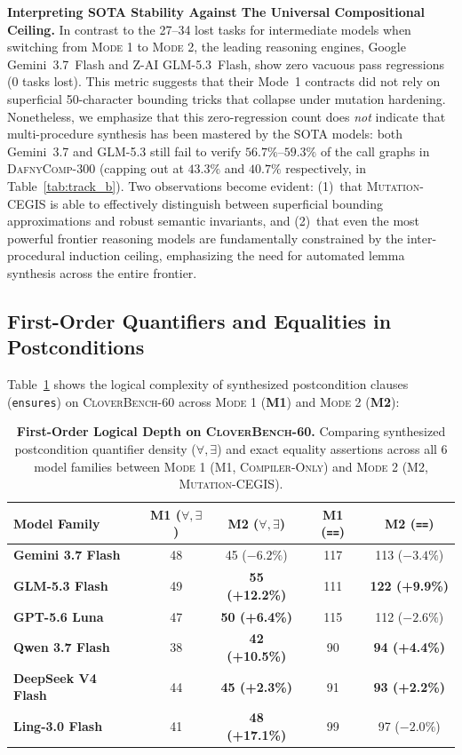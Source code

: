 \documentclass{article}
\begin{document}
\textbf{Interpreting SOTA Stability Against The Universal Compositional Ceiling.} In contrast to the 27--34 lost tasks for intermediate models when switching from \textsc{Mode 1} to \textsc{Mode 2}, the leading reasoning engines, Google Gemini~3.7~Flash and Z-AI GLM-5.3~Flash, show zero vacuous pass regressions (0 tasks lost). This metric suggests that their Mode~1 contracts did not rely on superficial 50-character bounding tricks that collapse under mutation hardening. Nonetheless, we emphasize that this zero-regression count does \textit{not} indicate that multi-procedure synthesis has been mastered by the SOTA models: both Gemini~3.7 and GLM-5.3 still fail to verify $56.7\%\text{--}59.3\%$ of the call graphs in \textsc{DafnyComp-300} (capping out at $43.3\%$ and $40.7\%$ respectively, in Table~\ref{tab:track_b}). Two observations become evident: (1)~that \textsc{Mutation-CEGIS} is able to effectively distinguish between superficial bounding approximations and robust semantic invariants, and (2)~that even the most powerful frontier reasoning models are fundamentally constrained by the inter-procedural induction ceiling, emphasizing the need for automated lemma synthesis across the entire frontier.

\subsection{First-Order Quantifiers and Equalities in Postconditions}

Table~\ref{tab:quantifier_density} shows the logical complexity of synthesized postcondition clauses (\texttt{ensures}) on \textsc{CloverBench-60} across \textsc{Mode 1} (\textbf{M1}) and \textsc{Mode 2} (\textbf{M2}):

\begin{table}[h]
\centering
\caption{\textbf{First-Order Logical Depth on \textsc{CloverBench-60}.} Comparing synthesized postcondition quantifier density ($\forall, \exists$) and exact equality assertions across all 6 model families between \textsc{Mode 1} (M1, \textsc{Compiler-Only}) and \textsc{Mode 2} (M2, \textsc{Mutation-CEGIS}).}
\label{tab:quantifier_density}
\setlength{\tabcolsep}{3.5pt}
\begin{tabular}{lcccc}
\toprule
\textbf{Model Family} & \textbf{M1 ($\forall, \exists$)} & \textbf{M2 ($\forall, \exists$)} & \textbf{M1 (\texttt{==})} & \textbf{M2 (\texttt{==})} \\
\midrule
\textbf{Gemini 3.7 Flash} & 48 & 45 ($-6.2\%$) & 117 & 113 ($-3.4\%$) \\
\textbf{GLM-5.3 Flash} & 49 & \textbf{55 (+12.2\%)} & 111 & \textbf{122 (+9.9\%)} \\
\textbf{GPT-5.6 Luna} & 47 & \textbf{50 (+6.4\%)} & 115 & 112 ($-2.6\%$) \\
\textbf{Qwen 3.7 Flash} & 38 & \textbf{42 (+10.5\%)} & 90 & \textbf{94 (+4.4\%)} \\
\textbf{DeepSeek V4 Flash} & 44 & \textbf{45 (+2.3\%)} & 91 & \textbf{93 (+2.2\%)} \\
\textbf{Ling-3.0 Flash} & 41 & \textbf{48 (+17.1\%)} & 99 & 97 ($-2.0\%$) \\
\bottomrule
\end{tabular}
\end{table}
\end{document}
